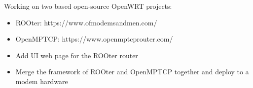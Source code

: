 \documentclass[11pt,oneside,a4paper]{article}
\begin{document}
\begin{tcolorbox}
\begin{minipage}[t]{11cm}
\begin{tcolorbox}[grow to right by=0.75cm,colback=white,colframe=white]
\begin{itemize}
{                    Working on two based open-source OpenWRT projects:
                    \begin{itemize}[label=$\circ$]
                        \item {ROOter: https://www.ofmodemsandmen.com/}
                        \item {OpenMPTCP: https://www.openmptcprouter.com/}
                        \item {Add UI web page for the ROOter router}
                        \item {Merge the framework of ROOter and OpenMPTCP together and deploy to a modem hardware}
                    \end{itemize}
                }
            \end{itemize}
        \end{tcolorbox}
    \end{minipage}

\end{tcolorbox}
\end{document}
